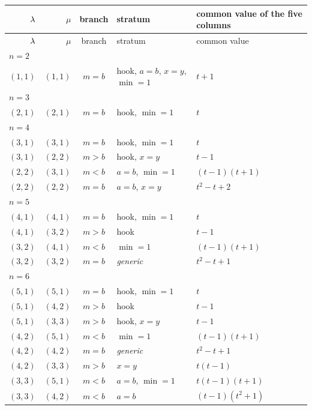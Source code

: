 \begin{longtable}{rrcll}
\toprule $\lambda$ & $\mu$ & branch & stratum & common value of the five columns\\ \midrule
\endfirsthead \toprule $\lambda$ & $\mu$ & branch & stratum & common value\\ \midrule \endhead
\multicolumn{5}{l}{\itshape $n=2$}\\
$(1,1)$ & $(1,1)$ & $m{=}b$ & hook, $a{=}b$, $x{=}y$, $\min{=}1$ & $t + 1$\\
\multicolumn{5}{l}{\itshape $n=3$}\\
$(2,1)$ & $(2,1)$ & $m{=}b$ & hook, $\min{=}1$ & $t$\\
\multicolumn{5}{l}{\itshape $n=4$}\\
$(3,1)$ & $(3,1)$ & $m{=}b$ & hook, $\min{=}1$ & $t$\\
$(3,1)$ & $(2,2)$ & $m{>}b$ & hook, $x{=}y$ & $t - 1$\\
$(2,2)$ & $(3,1)$ & $m{<}b$ & $a{=}b$, $\min{=}1$ & $\left(t - 1\right) \left(t + 1\right)$\\
$(2,2)$ & $(2,2)$ & $m{=}b$ & $a{=}b$, $x{=}y$ & $t^{2} - t + 2$\\
\multicolumn{5}{l}{\itshape $n=5$}\\
$(4,1)$ & $(4,1)$ & $m{=}b$ & hook, $\min{=}1$ & $t$\\
$(4,1)$ & $(3,2)$ & $m{>}b$ & hook & $t - 1$\\
$(3,2)$ & $(4,1)$ & $m{<}b$ & $\min{=}1$ & $\left(t - 1\right) \left(t + 1\right)$\\
$(3,2)$ & $(3,2)$ & $m{=}b$ & \emph{generic} & $t^{2} - t + 1$\\
\multicolumn{5}{l}{\itshape $n=6$}\\
$(5,1)$ & $(5,1)$ & $m{=}b$ & hook, $\min{=}1$ & $t$\\
$(5,1)$ & $(4,2)$ & $m{>}b$ & hook & $t - 1$\\
$(5,1)$ & $(3,3)$ & $m{>}b$ & hook, $x{=}y$ & $t - 1$\\
$(4,2)$ & $(5,1)$ & $m{<}b$ & $\min{=}1$ & $\left(t - 1\right) \left(t + 1\right)$\\
$(4,2)$ & $(4,2)$ & $m{=}b$ & \emph{generic} & $t^{2} - t + 1$\\
$(4,2)$ & $(3,3)$ & $m{>}b$ & $x{=}y$ & $t \left(t - 1\right)$\\
$(3,3)$ & $(5,1)$ & $m{<}b$ & $a{=}b$, $\min{=}1$ & $t \left(t - 1\right) \left(t + 1\right)$\\
$(3,3)$ & $(4,2)$ & $m{<}b$ & $a{=}b$ & $\left(t - 1\right) \left(t^{2} + 1\right)$\\

\end{longtable}
